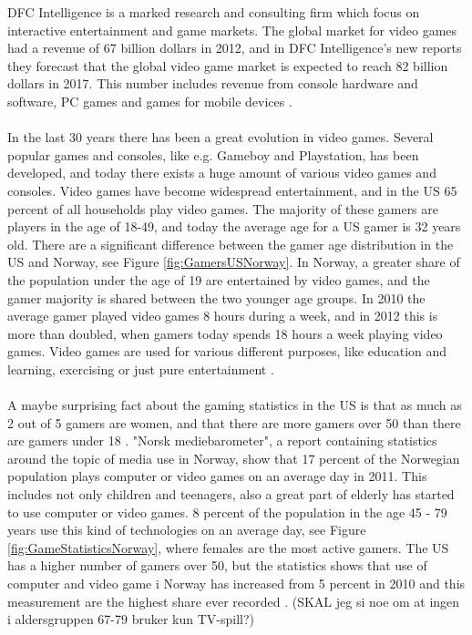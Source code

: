 DFC Intelligence is a marked research and consulting firm which focus on interactive entertainment and game markets. The global market for video games had a revenue of 67 billion dollars in 2012, and in DFC Intelligence's new reports they forecast that the global video game market is expected to reach 82 billion dollars in 2017. This number includes revenue from console hardware and software, PC games and games for mobile devices \cite{videogameforcast} \cite{aboutdfcint}. \\ \\
In the last 30 years there has been a great evolution in video games. Several popular games and consoles, like e.g. Gameboy and Playstation, has been developed, and today there exists a huge amount of various video games and consoles. Video games have become widespread entertainment, and in the US 65 percent of all households play video games. The majority of these gamers are players in the age of 18-49, and today the average age for a US gamer is 32 years old. There are a significant difference between the gamer age distribution in the US and Norway, see Figure \ref{fig:GamersUSNorway}. In Norway, a greater share of the population under the age of 19 are entertained by video games, and the gamer majority is shared between the two younger age groups. In 2010 the average gamer played video games 8 hours during a week, and in 2012 this is more than doubled, when gamers today spends 18 hours a week playing video games.  Video games are used for various different purposes, like education and learning, exercising or just pure entertainment \cite{statistics2010} \cite{statistics2012}. \\ \\
A maybe surprising fact about the gaming statistics in the US is that as much as 2 out of 5 gamers are women, and that there are more gamers over 50 than there are gamers under 18 \cite{statistics2012}. "Norsk mediebarometer", a report containing statistics around the topic of media use in Norway, show that 17 percent of the Norwegian population plays computer or video games on an average day in 2011. This includes not only children and teenagers, also a great part of elderly has started to use computer or video games. 8 percent of the population in the age 45 - 79 years use this kind of technologies on an average day, see Figure \ref{fig:GameStatisticsNorway}, where females are the most active gamers. The US has a higher number of gamers over 50, but the statistics shows that use of computer and video game i Norway has increased from 5 percent in 2010 and this measurement are the highest share ever recorded \cite{ssb2010} \cite{ssb2011}. (SKAL jeg si noe om at ingen i aldersgruppen 67-79 bruker kun TV-spill?) 
